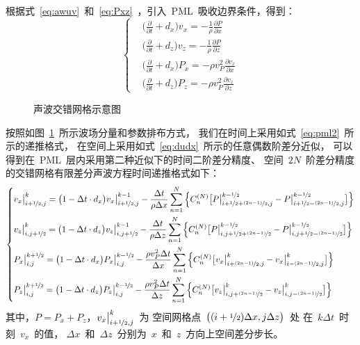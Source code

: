 \documentclass[UTF8]{ctexart}
\begin{document}
根据式~\eqref{eq:awuv}~和~\eqref{eq:Pxz}~，引入~PML~吸收边界条件，得到：
\begin{equation}
\left\{ \begin{aligned}
& \big(\frac{\partial}{\partial t}+d_x\big)v_x=-\frac{1}{\rho}\frac{\partial P}{\partial x} \\
& \big(\frac{\partial}{\partial t}+d_z\big)v_z=-\frac{1}{\rho}\frac{\partial P}{\partial z} \\
& \big(\frac{\partial}{\partial t}+d_x\big)P_x=-\rho v_P^2\frac{\partial v_x}{\partial x} \\
& \big(\frac{\partial}{\partial t}+d_z\big)P_z=-\rho v_P^2\frac{\partial v_z}{\partial z}
\end{aligned} \right.
\end{equation}\par
\begin{figure}[t]
  \centering
  
  \caption{声波交错网格示意图}\label{fig:asg}
\end{figure}
按照如图~\ref{fig:asg}~所示波场分量和参数排布方式，
我们在时间上采用如式~\eqref{eq:pml2}~所示的递推格式，
在空间上采用如式~\eqref{eq:dudx}~所示的任意偶数阶差分近似，
可以得到在~PML~层内采用第二种近似下的时间二阶差分精度、
空间~$2N$~阶差分精度的交错网格有限差分声波方程时间递推格式如下：
\begin{equation}
\left\{ \begin{aligned}
& v_x\big|_{i+\nicefrac{1}{2},j}^k=\big(1-\Delta t\cdot d_x\big) v_x\big|_{i+\nicefrac{1}{2},j}^{k-1}-\frac{\Delta t}{\rho\Delta x}\sum\limits_{n=1}^N\Big\{C_n^{(N)}\big[P\big|_{i+\nicefrac{1}{2}+\nicefrac{(2n-1)}{2},j}^{k-\nicefrac{1}{2}}-P\big|_{i+\nicefrac{1}{2}-\nicefrac{(2n-1)}{2},j}^{k-\nicefrac{1}{2}}\big]\Big\} \\
& v_z\big|_{i,j+\nicefrac{1}{2}}^k=\big(1-\Delta t\cdot d_z\big) v_z\big|_{i,j+\nicefrac{1}{2}}^{k-1}-\frac{\Delta t}{\rho\Delta z}\sum\limits_{n=1}^N\Big\{C_n^{(N)}\big[P\big|_{i,j+\nicefrac{1}{2}+\nicefrac{(2n-1)}{2}}^{k-\nicefrac{1}{2}}-P\big|_{i,j+\nicefrac{1}{2}-\nicefrac{(2n-1)}{2}}^{k-\nicefrac{1}{2}}\big]\Big\} \\
& P_x\big|_{i,j}^{k+\nicefrac{1}{2}}=\big(1-\Delta t\cdot d_x\big) P_x\big|_{i,j}^{k-\nicefrac{1}{2}}-\frac{\rho v_P^2\Delta t}{\Delta x}\sum\limits_{n=1}^N\Big\{C_n^{(N)}\big[v_x\big|_{i+\nicefrac{(2n-1)}{2},j}^k-v_x\big|_{i-\nicefrac{(2n-1)}{2},j}^k\big]\Big\} \\
& P_z\big|_{i,j}^{k+\nicefrac{1}{2}}=\big(1-\Delta t\cdot d_z\big) P_z\big|_{i,j}^{k-\nicefrac{1}{2}}-\frac{\rho v_P^2\Delta t}{\Delta z}\sum\limits_{n=1}^N\Big\{C_n^{(N)}\big[v_z\big|_{i,j+\nicefrac{(2n-1)}{2}}^k-v_z\big|_{i,j-\nicefrac{(2n-1)}{2}}^k\big]\Big\}
\end{aligned} \right.
\end{equation}
其中，$P=P_x+P_z$，$v_x\big|_{i+\nicefrac{1}{2},j}^k$~为
空间网格点~$\big((i+\nicefrac{1}{2})\Delta x,j\Delta z\big)$~处
在~$k\Delta t$~时刻~$v_x$~的值，
$\Delta x$~和~$\Delta z$~分别为~$x$~和~$z$~方向上空间差分步长。
\end{document}
